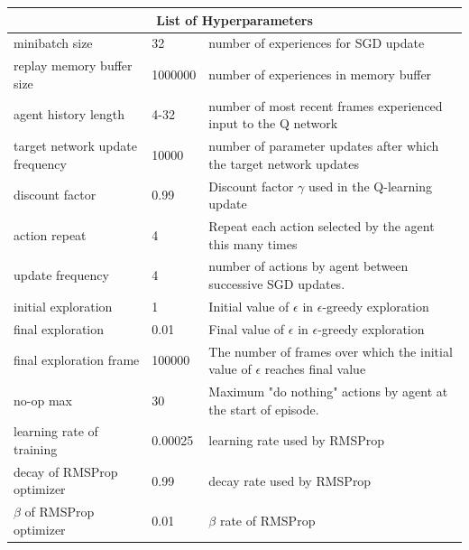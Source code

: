 \documentclass{article}
\begin{document}
\begin{tabular}{ |l|l|l| }
  \hline
  \multicolumn{3}{|c|}{List of Hyperparameters} \\
  \hline
  minibatch size & 32 & number of experiences for SGD update\\
  replay memory buffer size & 1000000 & number of experiences in memory buffer\\
  agent history length & 4-32 & number of most recent frames experienced input to the Q network\\
  target network update frequency & 10000 & number of parameter updates after which the target network updates\\
  discount factor & 0.99 & Discount factor $\gamma$ used in the Q-learning update\\
  action repeat & 4 & Repeat each action selected by the agent this many times\\
  update frequency & 4 & number of actions by agent between successive SGD updates. \\
  initial exploration & 1 & Initial value of $\epsilon$ in $\epsilon$-greedy exploration \\
  final exploration & 0.01 & Final value of $\epsilon$ in $\epsilon$-greedy exploration\\
  final exploration frame & 100000 & The number of frames over which the initial value of $\epsilon$ reaches final value\\
  no-op max & 30 & Maximum "do nothing" actions by agent at the start of episode.\\
  learning rate of training & 0.00025 & learning rate used by RMSProp\\
  decay of RMSProp optimizer & 0.99 & decay rate used by RMSProp\\
  $\beta$ of RMSProp optimizer & 0.01 & $\beta$ rate of RMSProp\\
  \hline
\end{tabular}
\end{document}
